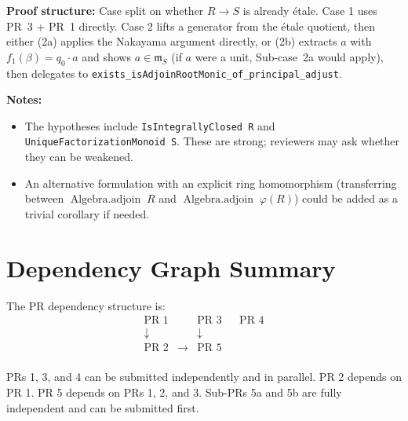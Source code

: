 \textbf{Proof structure:} Case split on whether $R \to S$ is already étale.
Case 1 uses PR~3 + PR~1 directly.
Case 2 lifts a generator from the étale quotient, then either
(2a) applies the Nakayama argument directly, or
(2b) extracts $a$ with $f_1(\beta) = q_0 \cdot a$ and shows $a \in \mathfrak{m}_S$
(if $a$ were a unit, Sub-case~2a would apply), then delegates to
\texttt{exists\_isAdjoinRootMonic\_of\_principal\_adjust}.

\textbf{Notes:}
\begin{itemize}
  \item The hypotheses include \texttt{IsIntegrallyClosed R} and
    \texttt{UniqueFactorizationMonoid S}. These are strong; reviewers may
    ask whether they can be weakened.
  \item An alternative formulation with an explicit ring homomorphism
    (transferring between $\operatorname{Algebra.adjoin}\;R$ and
    $\operatorname{Algebra.adjoin}\;\varphi(R)$) could be added as a
    trivial corollary if needed.
\end{itemize}


\section{Dependency Graph Summary}

The PR dependency structure is:
\[
  \begin{array}{ccccc}
    \text{PR 1} & & \text{PR 3} & & \text{PR 4} \\
    \downarrow & & \downarrow & & \\
    \text{PR 2} & \to & \text{PR 5} & & \\
  \end{array}
\]

PRs 1, 3, and 4 can be submitted independently and in parallel.
PR 2 depends on PR 1.
PR 5 depends on PRs 1, 2, and 3.
Sub-PRs 5a and 5b are fully independent and can be submitted first.


